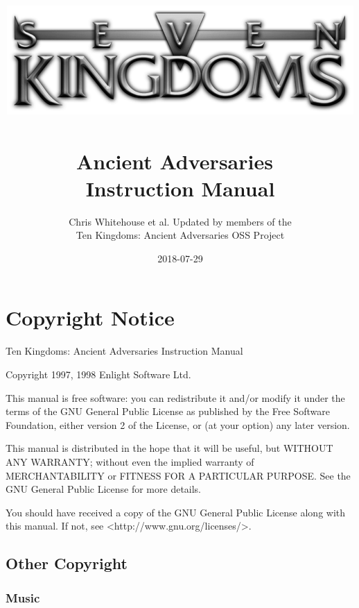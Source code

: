 \documentclass[openany]{book}
\begin{document}
\title{
\includegraphics[width=0.9\linewidth]{10kingdoms_logo}~\\[1cm]
{\Huge{\textbf{Ancient Adversaries}}}~\\[1cm]
{\huge{\textbf{Instruction Manual}}}
}
\author{Chris Whitehouse et al. Updated by members of the \\
Ten Kingdoms: Ancient Adversaries OSS Project} %
\date{2018-07-29} %

\frontmatter
\maketitle

\section*{Copyright Notice}

Ten Kingdoms: Ancient Adversaries Instruction Manual

Copyright 1997, 1998 Enlight Software Ltd.

This manual is free software: you can redistribute it and/or modify it under the terms of the GNU General Public License as published by the Free Software Foundation, either version 2 of the License, or (at your option) any later version.

This manual is distributed in the hope that it will be useful, but WITHOUT ANY WARRANTY; without even the implied warranty of MERCHANTABILITY or FITNESS FOR A PARTICULAR PURPOSE.  See the GNU General Public License for more details.

You should have received a copy of the GNU General Public License along with this manual.  If not, see <http://www.gnu.org/licenses/>.

\subsection*{Other Copyright}

\subsubsection*{Music}
\end{document}
